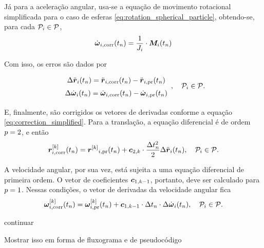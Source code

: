 Já para a aceleração angular, usa-se a equação de movimento rotacional simplificada para o caso de esferas \eqref{eq:rotation_spherical_particle}, obtendo-se, para cada \(\particlei\in\particleSet\),
\begin{equation*}
	\dangularVelocityicorr{1}\pqty{\instant[n]} = \dfrac{1}{\momentOfInertiai}\cdot\resultingTorquei\pqty{\instant[n]}
\end{equation*}

Com isso, os erros são dados por
\begin{equation*}
	\def\arraystretch{1.5}
	\begin{array}{c}
		\Delta \accelerationi\pqty{\instant[n]} = \accelerationicorr\pqty{\instant[n]} - \accelerationipr\pqty{\instant[n]} \\
		\Delta \dangularVelocityi{1}\pqty{\instant[n]} = \dangularVelocityicorr{1}\pqty{\instant[n]} - \dangularVelocityipr{1}\pqty{\instant[n]} \\
	\end{array}, \quad\particlei\in\particleSet.
\end{equation*}

E, finalmente, são corrigidos os vetores de derivadas conforme a equação \eqref{eq:correction_simplified}. Para a translação, a equação diferencial é de ordem \(\eqOrder = 2\), e então
\begin{equation*}
	\drvec{\taylorOrder}{\positionicorr}\pqty{\instant[n]} = \drvecipr{\taylorOrder}{\position}\pqty{\instant[n]} + \correctorConstantVector{\taylorOrder}{2}\cdot\dfrac{\Dt[n]^2}{2}\Delta \accelerationi\pqty{\instant[n]}, \quad\particlei\in\particleSet.
\end{equation*}

A velocidade angular, por sua vez, está sujeita a uma equação diferencial de primeira ordem. O vetor de coeficientes \(\correctorConstantVector{\taylorOrder-1}{1}\), portanto, deve ser calculado para \(\eqOrder=1\). Nessas condições, o vetor de derivadas da velocidade angular fica
\begin{equation*}
		\drvec{\taylorOrder}{\angularVelocityicorr}\pqty{\instant[n]} = \drvec{\taylorOrder}{\angularVelocityipr}\pqty{\instant[n]} + \correctorConstantVector{\taylorOrder-1}{1}\cdot\Dt[n]\cdot\Delta \dangularVelocityi{1}\pqty{\instant[n]}, \quad\particlei\in\particleSet.
\end{equation*}

\alert{continuar}

\alert{Mostrar isso em forma de fluxograma e de pseudocódigo}

